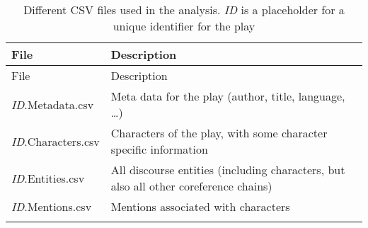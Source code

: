 \documentclass[]{book}
\begin{document}
\begin{longtable}[]{@{}ll@{}}
\caption{Different CSV files used in the analysis. \emph{ID} is a placeholder for a unique identifier for the play}\tabularnewline
\toprule
\begin{minipage}[b]{0.26\columnwidth}\raggedright
File\strut
\end{minipage} & \begin{minipage}[b]{0.68\columnwidth}\raggedright
Description\strut
\end{minipage}\tabularnewline
\midrule
\endfirsthead
\toprule
\begin{minipage}[b]{0.26\columnwidth}\raggedright
File\strut
\end{minipage} & \begin{minipage}[b]{0.68\columnwidth}\raggedright
Description\strut
\end{minipage}\tabularnewline
\midrule
\endhead
\begin{minipage}[t]{0.26\columnwidth}\raggedright
\emph{ID}.Metadata.csv\strut
\end{minipage} & \begin{minipage}[t]{0.68\columnwidth}\raggedright
Meta data for the play (author, title, language, \ldots{})\strut
\end{minipage}\tabularnewline
\begin{minipage}[t]{0.26\columnwidth}\raggedright
\emph{ID}.Characters.csv\strut
\end{minipage} & \begin{minipage}[t]{0.68\columnwidth}\raggedright
Characters of the play, with some character specific information\strut
\end{minipage}\tabularnewline
\begin{minipage}[t]{0.26\columnwidth}\raggedright
\emph{ID}.Entities.csv\strut
\end{minipage} & \begin{minipage}[t]{0.68\columnwidth}\raggedright
All discourse entities (including characters, but also all other coreference chains)\strut
\end{minipage}\tabularnewline
\begin{minipage}[t]{0.26\columnwidth}\raggedright
\emph{ID}.Mentions.csv\strut
\end{minipage} & \begin{minipage}[t]{0.68\columnwidth}\raggedright
Mentions associated with characters\strut
\end{minipage}\tabularnewline
\begin{minipage}[t]{0.26\columnwidth}\raggedright

\end{minipage}
\end{longtable}
\end{document}
